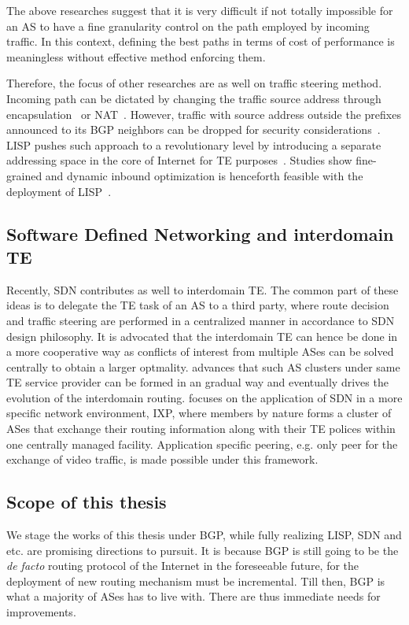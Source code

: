 The above researches suggest that it is very difficult if not totally impossible for an AS to have a fine granularity control on the path employed by incoming traffic. In this context, defining the best paths in terms of cost of performance is meaningless without effective method enforcing them. 

Therefore, the focus of other researches are as well on traffic steering method.
Incoming path can be dictated by changing the traffic source address through encapsulation~\cite{Liu2008} or \ac{NAT}~\cite{Sun2015}. However, traffic with source address outside the prefixes announced to its BGP neighbors can be dropped for security considerations~\cite{filtering}.
\ac{LISP} pushes such approach to a revolutionary level by introducing a separate addressing space in the core of Internet for TE purposes~\cite{lisp}. Studies show fine-grained and dynamic inbound optimization is henceforth feasible with the deployment of \ac{LISP}~\cite{Iannone2007, saucez2011mechanisms, quoitin2007evaluating}.

\subsection{Software Defined Networking and interdomain TE}
Recently, \ac{SDN} contributes as well to interdomain TE. The common part of these ideas is to delegate the TE task of an AS to a third party, where route decision and traffic steering are performed in a centralized manner in accordance to \ac{SDN} design philosophy. It is advocated that the interdomain TE can hence be done in a more cooperative way as conflicts of interest from multiple ASes can be solved centrally to obtain a larger optmality.
\citet{Kotronis2012} advances that such AS clusters under same TE service provider can be formed in an gradual way and eventually drives the evolution of the interdomain routing.
\citet{Gupta2014} focuses on the application of \ac{SDN} in a more specific network environment, \ac{IXP}, where members by nature forms a cluster of ASes that exchange their routing information along with their TE polices within one centrally managed facility. Application specific peering, e.g. only peer for the exchange of video traffic, is made possible under this framework.

\subsection{Scope of this thesis}
We stage the works of this thesis under BGP, while fully realizing \ac{LISP}, \ac{SDN} and etc. are promising directions to pursuit.
It is because BGP is still going to be the \textit{de facto} routing protocol of the Internet in the foreseeable future, for the deployment of new routing mechanism must be incremental.
Till then,  BGP is what a majority of ASes has to live with. 
There are thus immediate needs for improvements.

